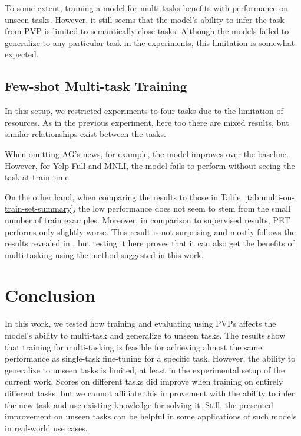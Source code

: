 \documentclass[11pt,a4paper]{article}
\begin{document}
To some extent, training a model for multi-tasks benefits with performance on unseen tasks.
However, it still seems that the model's ability to infer the task from PVP is limited to semantically close tasks.
Although the models failed to generalize to any particular task in the experiments, this limitation is somewhat expected.

\subsection{Few-shot Multi-task Training}
In this setup, we restricted experiments to four tasks due to the limitation of resources.
As in the previous experiment, here too there are mixed results, but similar relationships exist between the tasks.

When omitting AG's news, for example, the model improves over the baseline.
However, for Yelp Full and MNLI, the model fails to perform without seeing the task at train time.

On the other hand, when comparing the results to those in Table~\ref{tab:multi-on-train-set-summary},
the low performance does not seem to stem from the small number of train examples.
Moreover, in comparison to supervised results, PET performs only slightly worse.
This result is not surprising and mostly follows the results revealed in \citet{schick2020exploiting}, but testing it here proves that it can also get the benefits of multi-tasking using the method suggested in this work.

\section{Conclusion}
In this work, we tested how training and evaluating using PVPs affects the model's ability to multi-task and generalize to unseen tasks.
The results show that training for multi-tasking is feasible for achieving almost the same performance as single-task fine-tuning for a specific task.
However, the ability to generalize to unseen tasks is limited, at least in the experimental setup of the current work.
Scores on different tasks did improve when training on entirely different tasks, but we cannot affiliate this improvement with the ability to infer the new task and use existing knowledge for solving it. 
Still, the presented improvement on unseen tasks can be helpful in some applications of such models in real-world use cases. 

\nocite{*}


\end{document}
